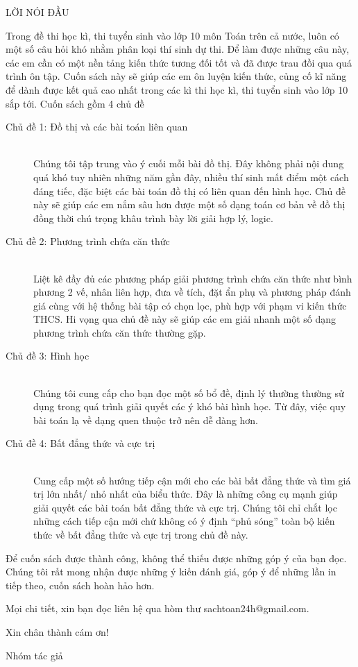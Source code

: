 


\newpage


\begin{center}\color{blue}
	\MakeUppercase{\LARGE  Lời nói đầu}
\end{center}

\setcounter{page}{3}
{
\linespread{1}
Trong đề thi học kì, thi tuyển sinh vào lớp 10 môn Toán trên cả nước, luôn có một số câu hỏi khó nhằm phân loại thí sinh dự thi. Để làm được những câu này, các em cần có một nền tảng kiến thức tương đối tốt và đã được trau đồi qua quá trình ôn tập. Cuốn sách này sẽ giúp các em ôn luyện kiến thức, củng cố kĩ năng để dành được kết quả cao nhất trong các kì thi học kì, thi tuyển sinh vào lớp 10 sắp tới. Cuốn sách gồm 4 chủ đề
\begin{description}
	\item[Chủ đề 1: Đồ thị và các bài toán liên quan] \,\\	
	Chúng tôi tập trung vào ý cuối mỗi bài đồ thị. Đây không phải nội dung quá khó tuy nhiên những năm gần đây, nhiều thí sinh mất điểm một cách đáng tiếc, đặc biệt các bài toán đồ thị có liên quan đến hình học. Chủ đề này sẽ giúp các em nắm sâu hơn được một số dạng toán cơ bản về đồ thị đồng thời chú trọng khâu trình bày lời giải hợp lý, logic.
	
	\item[Chủ đề 2: Phương trình chứa căn thức]\,\\	
	Liệt kê đầy đủ các phương pháp giải phương trình chứa căn thức như bình phương 2 vế, nhân liên hợp, đưa về tích, đặt ẩn phụ và phương pháp đánh giá cùng với hệ thống bài tập có chọn lọc, phù hợp với phạm vi kiến thức THCS. Hi vọng qua chủ đề này sẽ giúp các em giải nhanh một số dạng phương trình chứa căn thức thường gặp.
	
	\item[Chủ đề 3: Hình học] \,\\	
	Chúng tôi cung cấp cho bạn đọc một số bổ đề, định lý thường thường sử dụng trong quá trình giải quyết các ý khó bài hình học. Từ đây, việc quy bài toán lạ về dạng quen thuộc trở nên dễ dàng hơn.
	
	\item[Chủ đề 4: Bất đẳng thức và cực trị]\,\\	
	Cung cấp một số hướng tiếp cận mới cho các bài bất đẳng thức và tìm giá trị lớn nhất/ nhỏ nhất của biểu thức. Đây là những công cụ mạnh giúp giải quyết các bài toán bất đẳng thức và cực trị. Chúng tôi chỉ chắt lọc những cách tiếp cận mới chứ không có ý định “phủ sóng” toàn bộ kiến thức về bất đẳng thức và cực trị trong chủ đề này.
\end{description}

Để cuốn sách được thành công, không thể thiếu được những góp ý của bạn đọc. Chúng tôi rất mong nhận được những ý kiến đánh giá, góp ý để những lần in tiếp theo, cuốn sách hoàn hảo hơn.

Mọi chi tiết, xin bạn đọc liên hệ qua hòm thư sachtoan24h@gmail.com.

\hfill Xin chân thành cám ơn!

\hfill Nhóm tác giả


}

















